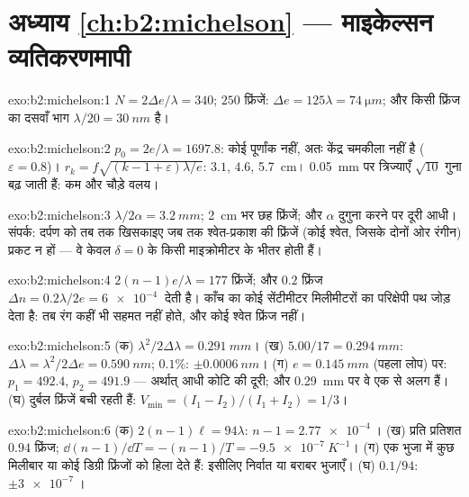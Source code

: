 \section*{अध्याय \ref{ch:b2:michelson} --- माइकेल्सन व्यतिकरणमापी}

\begin{solution}{exo:b2:michelson:1}
$N = 2\Delta e/\lambda = 340$; $250$ फ्रिंजें: $\Delta e = 125\lambda = \qty{74}{\micro m}$; और किसी फ्रिंज का
दसवाँ भाग $\lambda/20 = \qty{30}{nm}$ है।
\end{solution}

\begin{solution}{exo:b2:michelson:2}
$p_0 = 2e/\lambda = 1697.8$: कोई पूर्णांक नहीं, अतः केंद्र चमकीला नहीं है ($\varepsilon =
0.8$)। $r_k = f\sqrt{(k - 1 + \varepsilon)\lambda/e}$: $3.1$, $4.6$, \qty{5.7}{cm}। \qty{0.05}{mm} पर
त्रिज्याएँ $\sqrt{10}$ गुना बढ़ जाती हैं: कम और चौड़े वलय।
\end{solution}

\begin{solution}{exo:b2:michelson:3}
$\lambda/2\alpha = \qty{3.2}{mm}$; \qty{2}{cm} भर छह फ्रिंजें; और $\alpha$ दुगुना करने पर दूरी
आधी। संपर्क: दर्पण को तब तक खिसकाइए जब तक श्वेत-प्रकाश की फ्रिंजें
(कोई श्वेत, जिसके दोनों ओर रंगीन) प्रकट न हों --- वे केवल
$\delta = 0$ के किसी माइक्रोमीटर के भीतर होती हैं।
\end{solution}

\begin{solution}{exo:b2:michelson:4}
$2(n - 1)e/\lambda = 177$ फ्रिंजें; और $0.2$ फ्रिंज $\Delta n = 0.2\lambda/2e = \qty{6e-4}{}$ देती है।
काँच का कोई सेंटीमीटर मिलीमीटरों का परिक्षेपी पथ जोड़ देता है: तब रंग
कहीं भी सहमत नहीं होते, और कोई श्वेत फ्रिंज नहीं।
\end{solution}

\begin{solution}{exo:b2:michelson:5}
(क) $\lambda^2/2\Delta\lambda = \qty{0.291}{mm}$। (ख) $5.00/17 = \qty{0.294}{mm}$: $\Delta\lambda = \lambda^2/2\Delta e =
\qty{0.590}{nm}$; $0.1\%$: $\pm\qty{0.0006}{nm}$। (ग) $e = \qty{0.145}{mm}$ (पहला
लोप) पर: $p_1 = 492.4$, $p_2 = 491.9$ --- अर्थात् आधी कोटि की दूरी; और
\qty{0.29}{mm} पर वे एक से अलग हैं। (घ) दुर्बल फ्रिंजें बची रहती हैं: $V_{\min} =
(I_1 - I_2)/(I_1 + I_2) = 1/3$।
\end{solution}

\begin{solution}{exo:b2:michelson:6}
(क) $2(n - 1)\ell = 94\lambda$: $n - 1 = \qty{2.77e-4}{}$। (ख) प्रति प्रतिशत $0.94$ फ्रिंज;
$\dd(n - 1)/\dd T = -(n - 1)/T = \qty{-9.5e-7}{K^{-1}}$। (ग) एक भुजा में कुछ मिलीबार या कोई
डिग्री फ्रिंजों को हिला देते हैं: इसीलिए निर्वात या बराबर भुजाएँ। (घ)
$0.1/94$: $\pm\qty{3e-7}{}$।
\end{solution}

